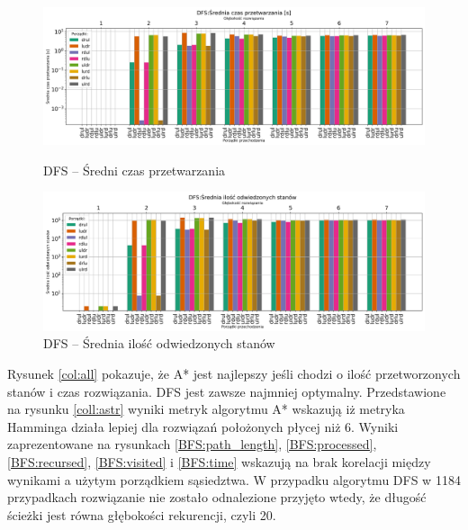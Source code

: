 \documentclass{classrep}
\begin{document}
\begin{figure}[H]
    \includegraphics[width=\textwidth]{charts/DFS_time.png}
    \caption{DFS -- Średni czas przetwarzania}
    \label{DFS:time}
    \includegraphics[width=\textwidth]{charts/DFS_visited.png}
    \caption{DFS -- Średnia ilość odwiedzonych stanów}
    \label{DFS:visited}
\end{figure}
\restoregeometry
Rysunek \ref{col:all} pokazuje, że A* jest najlepszy jeśli chodzi o ilość przetworzonych stanów i czas rozwiązania. DFS jest zawsze najmniej optymalny.
Przedstawione na rysunku \ref{coll:astr} wyniki metryk algorytmu A* wskazują iż metryka Hamminga działa lepiej dla rozwiązań położonych płycej niż 6.
Wyniki zaprezentowane na rysunkach \ref{BFS:path_length}, \ref{BFS:processed}, \ref{BFS:recursed}, \ref{BFS:visited} i \ref{BFS:time} wskazują na brak korelacji między wynikami a użytym porządkiem sąsiedztwa.
W przypadku algorytmu DFS w 1184 przypadkach rozwiązanie nie zostało odnalezione przyjęto wtedy, że długość ścieżki jest równa głębokości rekurencji, czyli 20.
\end{document}
